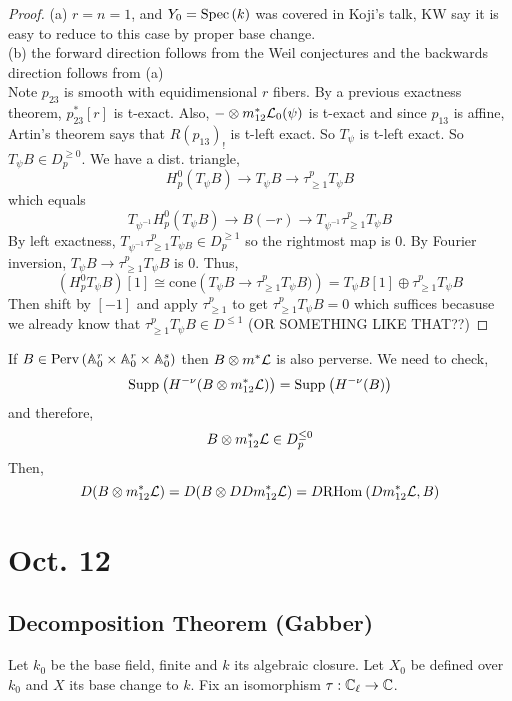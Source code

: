 \documentclass[12pt]{article}
\begin{document}
\begin{proof}
(a) $r = n = 1$, and $Y_0 = \mathrm{Spec}\left( k \right)$ was covered in Koji's talk, KW say it is easy to reduce to this case by proper base change. 
\bigskip\\
(b) the forward direction follows from the Weil conjectures and the backwards direction follows from (a)
\bigskip\\
Note $p_{23}$ is smooth with equidimensional $r$ fibers. By a previous exactness theorem, $p_{23}^*[r]$ is t-exact. Also, $- \otimes  m_{12}^* \mathcal{L}_0(\psi)$ is t-exact and since $p_{13}$ is affine, Artin's theorem says that $R(p_{13})_!$ is t-left exact. So $T_\psi$ is t-left exact. So $T_\psi B \in D_p^{\ge 0}$. We have a dist. triangle,
\[ H_p^0(T_\psi B) \to T_\psi B \to \tau_{\ge 1}^p T_\psi B \]
which equals
\[ T_{\psi^{-1}} H_p^0(T_\psi B) \to B(-r) \to T_{\psi^{-1}} \tau_{\ge 1}^p T_\psi B \]
By left exactness, $T_{\psi^{-1}} \tau_{\ge 1}^p T_{\psi B} \in D_p^{\ge 1}$ so the rightmost map is $0$. By Fourier inversion, $T_\psi B \to \tau_{\ge 1}^p T_\psi B$ is 0. Thus,
\[ (H^0_p T_\psi B)[1] \cong \mathrm{cone} \left( T_\psi B \to \tau^p_{\ge 1} T_\psi B) \right) = T_\psi B[1] \oplus \tau_{\ge 1}^p T_{\psi} B \]
Then shift by $[-1]$ and apply $\tau_{\ge 1}^p$ to get $\tau^p_{\ge 1} T_\psi B = 0$ which suffices becasuse we already know that $\tau_{\ge 1}^p T_\psi B \in D^{\le 1}$ (OR SOMETHING LIKE THAT??)
\end{proof}

\begin{rmk}
If $B \in \mathrm{Perv}\left( \mathbb{A}^r_0 \times \mathbb{A}^r_0 \times \mathbb{A}^s_0 \right)$ then $B \otimes m^* \mathcal{L}$ is also perverse. We need to check,
\[ \mathrm{Supp}_{} \left( H^{-\nu}(B \otimes m_{12}^* \mathcal{L}) \right) = \mathrm{Supp}_{} \left( H^{-\nu}(B) \right) \]
and therefore,
\[ B \otimes m_{12}^* \mathcal{L} \in D_p^{\le 0} \]
Then,
\[ D(B \otimes m_{12}^* \mathcal{L}) = D(B \otimes DD m_{12}^* \mathcal{L}) = D \mathrm{RHom}_{} \left( D m_{12}^* \mathcal{L}, B \right) \]
\end{rmk}

\section{Oct. 12}

\subsection{Decomposition Theorem (Gabber)}

Let $k_0$ be the base field, finite and $k$ its algebraic closure. Let $X_0$ be defined over $k_0$ and $X$ its base change to $k$. Fix an isomorphism $\tau : \mathbb{C}_\ell \to \mathbb{C}$.
\end{document}
